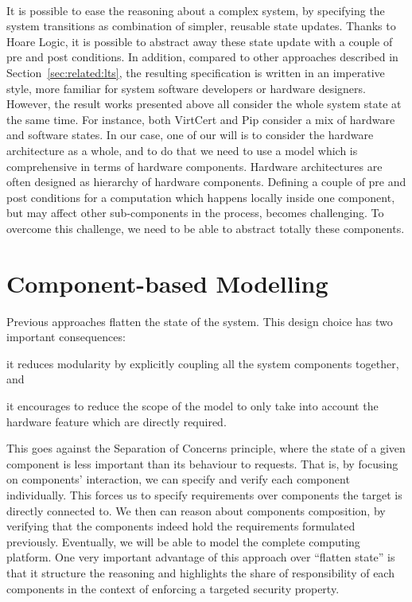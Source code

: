 \paragraph{}
%
It is possible to ease the reasoning about a complex system, by specifying the
system transitions as combination of simpler, reusable state updates.
%
Thanks to Hoare Logic, it is possible to abstract away these state update with a
couple of pre and post conditions.
%
In addition, compared to other approaches described in
Section~\ref{sec:related:lts}, the resulting specification is written in an
imperative style, more familiar for system software developers or hardware
designers.
%
However, the result works presented above all consider the whole system state at
the same time.
%
For instance, both VirtCert and Pip consider a mix of hardware and software
states.
%
In our case, one of our will is to consider the hardware architecture as a
whole, and to do that we need to use a model which is comprehensive in terms of
hardware components.
%
Hardware architectures are often designed as hierarchy of hardware components.
%
Defining a couple of pre and post conditions for a computation which happens
locally inside one component, but may affect other sub-components in the
process, becomes challenging.
%
To overcome this challenge, we need to be able to abstract totally these
components.

\section{Component-based Modelling} %
\label{sec:related:interface}

Previous approaches flatten the state of the system.
%
This design choice has two important consequences:
%
\begin{inparaenum}[(1)]
%
\item it reduces modularity by explicitly coupling all the system components
  together, and
%
\item it encourages to reduce the scope of the model to only take into account
  the hardware feature which are directly required.
%
\end{inparaenum}
%
This goes against the Separation of Concerns principle, where the state of a
given component is less important than its behaviour to requests.
%
That is, by focusing on components' interaction, we can specify and verify each
component individually.
%
This forces us to specify requirements over components the target is directly
connected to.
%
We then can reason about components composition, by verifying that the
components indeed hold the requirements formulated previously.
%
Eventually, we will be able to model the complete computing platform.
%
One very important advantage of this approach over ``flatten state'' is that it
structure the reasoning and highlights the share of responsibility of each
components in the context of enforcing a targeted security property.

